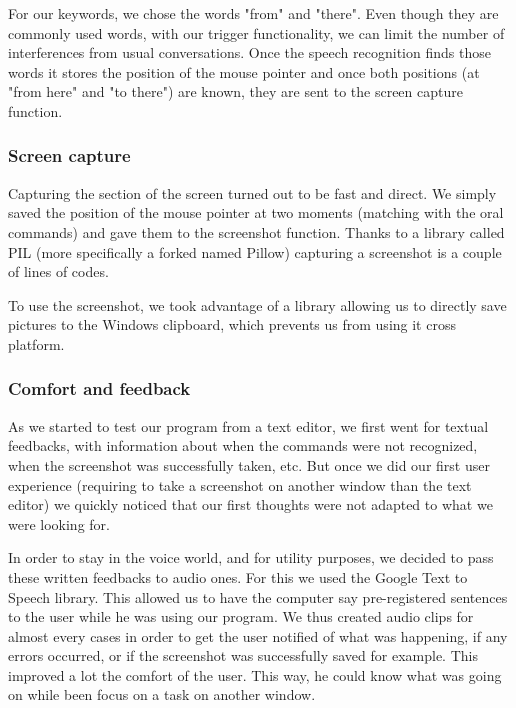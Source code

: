 For our keywords, we chose the words "from" and "there". Even though they are commonly used words, with our trigger functionality, we can limit the number of interferences from usual conversations.
Once the speech recognition finds those words it stores the position of the mouse pointer and once both positions (at "from here" and "to there") are known, they are sent to the screen capture function.

\subsubsection*{Screen capture}
Capturing the section of the screen turned out to be fast and direct. We simply saved the position of the mouse pointer at two moments (matching with the oral commands) and gave them to the screenshot function. Thanks to a library called PIL (more specifically a forked named Pillow) capturing a screenshot is a couple of lines of codes. 



To use the screenshot, we took advantage of a library allowing us to directly save pictures to the Windows clipboard, which prevents us from using it cross platform. 

\subsubsection*{Comfort and feedback}
As we started to test our program from a text editor, we first went for textual feedbacks, with information about when the commands were not recognized, when the screenshot was successfully taken, etc.
But once we did our first user experience (requiring to take a screenshot on another window than the text editor) we quickly noticed that our first thoughts were not adapted to what we were looking for.

In order to stay in the voice world, and for utility purposes, we decided to pass these written feedbacks to audio ones. For this we used the Google Text to Speech library. This allowed us to have the computer say pre-registered sentences to the user while he was using our program.
We thus created audio clips for almost every cases in order to get the user notified of what was happening, if any errors occurred, or if the screenshot was successfully saved for example.
This improved a lot the comfort of the user. This way, he could know what was going on while been focus on a task on another window.


